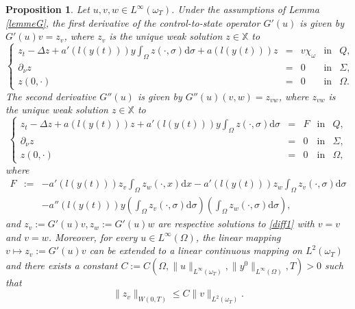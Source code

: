 \documentclass[reqno,twoside]{amsart}
\numberwithin{equation}{section}
\newtheorem{proposition}[theorem]{Proposition}
\theoremstyle{definition}
\numberwithin{equation}{section}
\def \dis {\displaystyle}
\def \dx{\mathrm{d}x}
\def \d {\mathrm{d}}
\begin{document}
\begin{proposition}\label{differentiability}
Let $u,v, w\in L^\infty(\omega_T)$.	Under the assumptions of Lemma \ref{lemmeG}, the first derivative of the control-to-state operator $G'(u)$ is given by $G'(u)v=z_v$, where $z_v$ is the unique weak solution $z\in \mathbb{X}$ to
\begin{equation}\label{diff1}
	\left\{
	\begin{array}{rllll}
		\dis z_t-\Delta z+a'(l(y(t)))y\int_{\Omega}z(\cdot,\sigma)\d\sigma+a(l(y(t)))z &=& v\chi_{\omega} &\mbox{in}& Q,\\
		\dis \partial_{\nu}z&=&0  &\mbox{in}& \Sigma,\\
		z(0,\cdot)&=& 0&\mbox{in}& \Omega.
	\end{array}
	\right.
\end{equation}
The second derivative $G''(u)$ is given by $G''(u)(v,w)=z_{vw}$, where $z_{vw}$ is the unique weak solution $z\in \mathbb{X}$	to
\begin{equation}\label{diff2}
	\left\{
	\begin{array}{rllll}
		\dis z_t-\Delta z+a(l(y(t)))z+a'(l(y(t)))y\int_{\Omega}z(\cdot,\sigma)\d\sigma &=&F &\mbox{in}& Q,\\
		\dis \partial_{\nu}z&=&0  &\mbox{in}& \Sigma,\\
		z(0,\cdot)&=& 0&\mbox{in}& \Omega,
	\end{array}
	\right.
\end{equation}
where
\begin{equation}\label{def0}
	\begin{array}{rllll}
		F&:=&\dis -a'(l(y(t)))z_v\int_{\Omega}z_w(\cdot,x)\dx-a'(l(y(t)))z_w\int_{\Omega}z_v(\cdot,\sigma)\d\sigma \\
		&&\dis -a''(l(y(t)))y\left(\int_{\Omega}z_v(\cdot,\sigma)\d\sigma\right)\left(\int_{\Omega}z_w(\cdot,\sigma)\d\sigma\right),
	\end{array}
\end{equation}
and $z_{v}:=G'(u)v,z_{w}:=G'(u)w$ are respective solutions to \eqref{diff1} with $v=v$ and $v=w$.
Moreover, for every $u\in L^\infty(\Omega)$, the linear mapping $v\mapsto z_v:= G'(u)v$ can be extended to a linear continuous mapping on $L^2(\omega_T)$ and there exists a constant $C:=C(\Omega,\|u\|_{L^\infty(\omega_T)},\|y^0\|_{L^\infty(\Omega)},T)>0$ such that
\begin{equation}\label{est1}
	\|z_v\|_{W(0,T)}\leq C\|v\|_{L^2(\omega_T)}.
\end{equation}	
\end{proposition}
\end{document}
